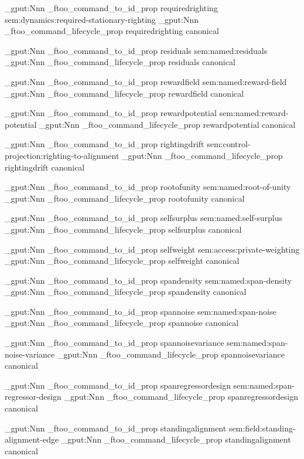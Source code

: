 \prop_gput:Nnn \g_ftoo_command_to_id_prop { requiredrighting } { sem:dynamics:required-stationary-righting }
\prop_gput:Nnn \g_ftoo_command_lifecycle_prop { requiredrighting } { canonical }


\prop_gput:Nnn \g_ftoo_command_to_id_prop { residuals } { sem:named:residuals }
\prop_gput:Nnn \g_ftoo_command_lifecycle_prop { residuals } { canonical }


\prop_gput:Nnn \g_ftoo_command_to_id_prop { rewardfield } { sem:named:reward-field }
\prop_gput:Nnn \g_ftoo_command_lifecycle_prop { rewardfield } { canonical }


\prop_gput:Nnn \g_ftoo_command_to_id_prop { rewardpotential } { sem:named:reward-potential }
\prop_gput:Nnn \g_ftoo_command_lifecycle_prop { rewardpotential } { canonical }


\prop_gput:Nnn \g_ftoo_command_to_id_prop { rightingdrift } { sem:control-projection:righting-to-alignment }
\prop_gput:Nnn \g_ftoo_command_lifecycle_prop { rightingdrift } { canonical }


\prop_gput:Nnn \g_ftoo_command_to_id_prop { rootofunity } { sem:named:root-of-unity }
\prop_gput:Nnn \g_ftoo_command_lifecycle_prop { rootofunity } { canonical }


\prop_gput:Nnn \g_ftoo_command_to_id_prop { selfsurplus } { sem:named:self-surplus }
\prop_gput:Nnn \g_ftoo_command_lifecycle_prop { selfsurplus } { canonical }


\prop_gput:Nnn \g_ftoo_command_to_id_prop { selfweight } { sem:access:private-weighting }
\prop_gput:Nnn \g_ftoo_command_lifecycle_prop { selfweight } { canonical }


\prop_gput:Nnn \g_ftoo_command_to_id_prop { spandensity } { sem:named:span-density }
\prop_gput:Nnn \g_ftoo_command_lifecycle_prop { spandensity } { canonical }


\prop_gput:Nnn \g_ftoo_command_to_id_prop { spannoise } { sem:named:span-noise }
\prop_gput:Nnn \g_ftoo_command_lifecycle_prop { spannoise } { canonical }


\prop_gput:Nnn \g_ftoo_command_to_id_prop { spannoisevariance } { sem:named:span-noise-variance }
\prop_gput:Nnn \g_ftoo_command_lifecycle_prop { spannoisevariance } { canonical }


\prop_gput:Nnn \g_ftoo_command_to_id_prop { spanregressordesign } { sem:named:span-regressor-design }
\prop_gput:Nnn \g_ftoo_command_lifecycle_prop { spanregressordesign } { canonical }


\prop_gput:Nnn \g_ftoo_command_to_id_prop { standingalignment } { sem:field:standing-alignment-edge }
\prop_gput:Nnn \g_ftoo_command_lifecycle_prop { standingalignment } { canonical }


